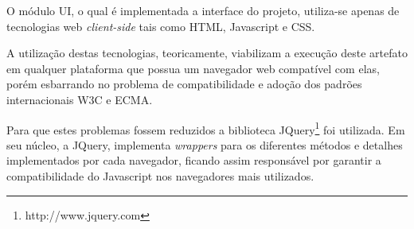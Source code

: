 O módulo UI, o qual é implementada a interface do projeto, utiliza-se apenas
de tecnologias web {\it client-side} tais como HTML, Javascript e CSS.

A utilização destas tecnologias, teoricamente, viabilizam a execução deste
artefato em qualquer plataforma que possua um navegador web compatível com elas,
porém esbarrando no problema de compatibilidade e adoção dos padrões 
internacionais W3C e ECMA.

Para que estes problemas fossem reduzidos a biblioteca 
JQuery\footnote{http://www.jquery.com} foi utilizada.
Em seu núcleo, a JQuery, implementa {\it wrappers} para os diferentes métodos
e detalhes implementados por cada navegador, ficando assim responsável por
garantir a compatibilidade do Javascript nos navegadores mais utilizados.
